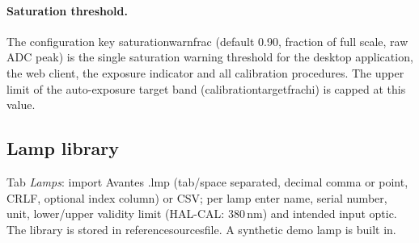 \documentclass[12pt,a4paper]{article}
\DeclareRobustCommand{\file}[1]{{\ttfamily\small\def\_{\rawus\allowbreak}#1}}
\DeclareRobustCommand{\key}[1]{{\ttfamily\small\color{acc2}\def\_{\rawus\allowbreak}#1}}
\newcommand{\nm}{\,nm}
\begin{document}
\paragraph{Saturation threshold.} The configuration key \key{saturation\_warn\_frac}
(default 0.90, fraction of full scale, raw ADC peak) is the single saturation
warning threshold for the desktop application, the web client, the exposure
indicator and all calibration procedures. The upper limit of the auto-exposure
target band (\key{calibration\_target\_frac\_hi}) is capped at this value.

\subsection{Lamp library}
Tab \emph{Lamps}: import Avantes \file{.lmp} (tab/space separated, decimal comma
or point, CRLF, optional index column) or CSV; per lamp enter name, serial number,
unit, lower/upper validity limit (HAL-CAL: 380\nm) and intended input optic. The
library is stored in \key{reference\_sources\_file}. A synthetic demo lamp is
built in.
\end{document}
